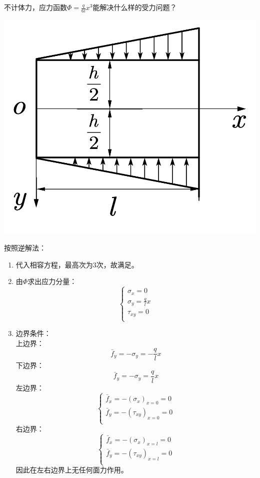 \begin{example}
	不计体力，应力函数$\varPhi =\frac{q}{6l}x^3$能解决什么样的受力问题？
\end{example}
\centerline{\includegraphics[scale=0.6]{figure/3-4.png}}

\begin{remark}
	按照逆解法：
	\begin{enumerate}
		\item 代入相容方程，最高次为3次，故满足。
		\item 由$\varPhi $求出应力分量：\[\begin{cases}
		\sigma _x=0\\
		\sigma _y=\frac{q}{l}x\\
		\tau _{xy}=0\\
		\end{cases}\]
		\item 边界条件：\\
		上边界：\[\bar{f}_y=-\sigma _y=-\frac{q}{l}x\]
		下边界：\[\bar{f}_y=-\sigma _y=\frac{q}{l}x\]
		左边界：\[\begin{cases}
		\bar{f}_x=-\left( \sigma _x \right) _{x=0}=0\\
		\bar{f}_y=-\left( \tau _{xy} \right) _{x=0}=0\\
		\end{cases}\]
		右边界：\[\begin{cases}
		\bar{f}_x=-\left( \sigma _x \right) _{x=l}=0\\
		\bar{f}_y=-\left( \tau _{xy} \right) _{x=l}=0\\
		\end{cases}\]
		因此在左右边界上无任何面力作用。
	\end{enumerate}
	
\end{remark}



